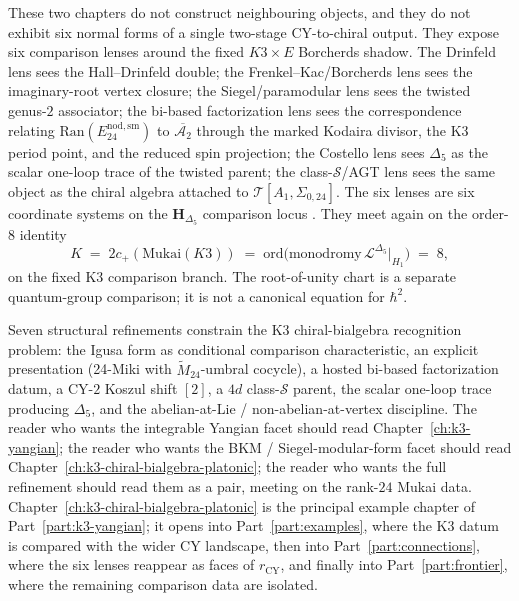 These two chapters do not construct neighbouring objects, and they do
not exhibit six normal forms of a single two-stage CY-to-chiral output.
They expose six comparison lenses around the fixed $K3\times E$
Borcherds shadow. The Drinfeld lens sees the
Hall--Drinfeld double; the Frenkel--Kac/Borcherds lens sees the
imaginary-root vertex closure; the Siegel/paramodular lens sees the
twisted genus-$2$ associator; the bi-based factorization lens sees the
correspondence relating $\mathrm{Ran}(E^{\mathrm{nod,sm}}_{24})$ to
$\overline{\mathcal{A}_2}$ through the marked Kodaira divisor, the K3
period point, and the reduced spin projection;
the Costello lens sees $\Delta_5$ as the scalar one-loop trace of the
twisted parent; the class-$\mathcal{S}$/AGT lens sees the same object as the
chiral algebra attached to $\mathcal{T}[A_1,\Sigma_{0,24}]$. The six
lenses are six coordinate systems on the $\mathbf{H}_{\Delta_5}$ comparison
locus
\cite{Drinfeld1985,Drinfeld1988,GritsenkoNikulin1995,GritsenkoNikulin1998,Gritsenko1999,Borcherds1992,Borcherds1998,Miki07}.
They meet again on the order-$8$ identity
\[
 K
 \;=\;
 2c_+(\mathrm{Mukai}(K3))
 \;=\;
 \mathrm{ord}\bigl(
 \mathrm{monodromy}\,\mathcal{L}^{\Delta_5}|_{H_1}
 \bigr)
 \;=\;
 8,
\]
on the fixed K3 comparison branch. The root-of-unity chart is a
separate quantum-group comparison; it is not a canonical equation for
\(\hbar^2\).

Seven structural refinements constrain the K3 chiral-bialgebra
recognition problem: the Igusa form as conditional comparison
characteristic, an explicit presentation (24-Miki with
$\widetilde{M}_{24}$-umbral cocycle), a hosted bi-based factorization datum, a CY-$2$
Koszul shift $[2]$, a $4d$ class-$\mathcal{S}$ parent, the scalar
one-loop trace producing $\Delta_5$, and the abelian-at-Lie /
non-abelian-at-vertex discipline. The reader who
wants the integrable Yangian facet should read Chapter~\ref{ch:k3-yangian}; the
reader who wants the BKM / Siegel-modular-form facet should read
Chapter~\ref{ch:k3-chiral-bialgebra-platonic}; the reader who wants the full
refinement should read them as a pair, meeting on the rank-$24$ Mukai data.
Chapter~\ref{ch:k3-chiral-bialgebra-platonic} is the principal example chapter of
Part~\ref{part:k3-yangian}; it opens into Part~\ref{part:examples},
where the K3 datum is compared with the wider CY landscape, then into
Part~\ref{part:connections}, where the six lenses reappear as faces of
$r_{\mathrm{CY}}$, and finally into Part~\ref{part:frontier}, where
the remaining comparison data are isolated.

